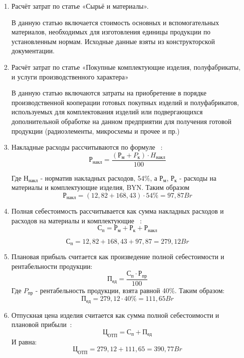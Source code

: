 \begin{enumerate}
\item Расчёт затрат по статье «Сырьё и материалы».

  В данную статью включается стоимость основных и вспомогательных
  материалов, необходимых для изготовления единицы продукции по
  установленным нормам. Исходные данные взяты из конструкторской
  документации.
  
  

\item Расчёт затрат по статье «Покупные комплектующие изделия,
  полуфабрикаты, и услуги производственного характера»

  В данную статью включаются затраты на приобретение в порядке
  производственной кооперации готовых покупных изделий и полуфабрикатов,
  используемых для комплектования изделий или подвергающихся
  дополнительной обработке на данном предприятии для получения готовой
  продукции (радиоэлементы, микросхемы и прочее и пр.)

  



  
\item Накладные расходы рассчитываются по формуле ~\cite{bsuir-project-economics}:
\begin{equation}
  Р_{накл}=\frac{(Р_м+P_к) \cdot H_{накл}}{100}
\end{equation}

Где  $Н_{накл}$ - норматив накладных расходов, 54\%, а $Р_м$, $Р_к$ - расходы на материалы и комплектующие изделия, BYN.
Таким образом
$$  Р_{накл}=(12,82+168,43) \cdot 54\%  = 97,87 Br$$

\item Полная себестоимость рассчитывается как сумма накладных расходов и
расходов на материалы и комплектующие ~\cite{bsuir-project-economics}:
\begin{equation}
  С_п =Р_м + Р_к + Р_{накл}
\end{equation} 

$$С_п = 12,82 + 168,43 + 97,87 = 279,12 Br$$ 

\item Плановая прибыль считается как произведение полной себестоимости и рентабельности продукции:
  \begin{equation}
    П_{ед}= \frac{С_п \cdot Р_{пр}}{100}
  \end{equation}
  Где  $P_{пр}$ - рентабельность продукции, взята равной 40\%.
  Таким образом:
$$ П_{ед} = 279,12 \cdot 40\% = 111,65 Br$$

\item Отпускная цена изделия считается как сумма полной себестоимости
  и плановой прибыли~\cite{bsuir-project-economics}:
  \begin{equation}
    Ц_{ОТП}=С_п+П_{ед}
  \end{equation}
  И равна: $$Ц_{ОТП}=279,12+111,65= 390,77Br$$ 
\end{enumerate}

